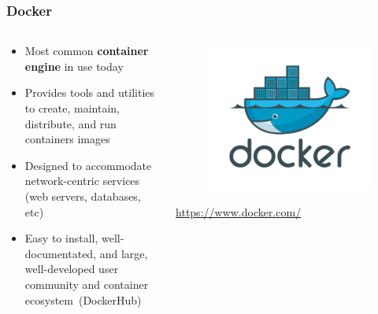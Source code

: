 \documentclass{beamer}
\begin{document}
\begin{frame}
   \frametitle{Docker}
   \begin{columns}
      \begin{column}{0.6\textwidth}
         \begin{itemize}
            \setlength\itemsep{1.0em}
            \item Most common \textbf{container engine} in use today  
            \item Provides tools and utilities to create, maintain, 
               distribute, and run containers images
            \item Designed to accommodate network-centric services (web 
               servers, databases, etc)
            \item Easy to install, well-documentated, and large, 
               well-developed user community and container 
               ecosystem~(DockerHub)
         \end{itemize}
      \end{column}
      \hfill
      \begin{column}{0.5\textwidth}
         \begin{figure}[htbp]
            \includegraphics[width=1.0\textwidth]{images/docker-logo.png}
         \end{figure}
         \begin{center}
            \url{https://www.docker.com/}
         \end{center}
      \end{column}
   \end{columns}
\end{frame}
\end{document}
